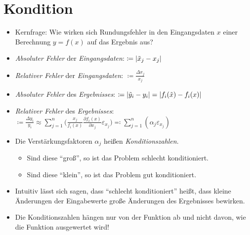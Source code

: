 	\section{Kondition} %
		\begin{itemize}
			\item Kernfrage: Wie wirken sich Rundungsfehler in den Eingangsdaten \( x \) einer Berechnung \( y = f(x) \) auf das Ergebnis aus?
			\item \textit{Absoluter Fehler} der \textit{Eingangsdaten}: \tabto{6.5cm} \phantom{XXX} \(\coloneqq \abs{\tilde{x} _ j - x _ j} \)
			\item \textit{Relativer Fehler} der \textit{Eingangsdaten}: \tabto{6.5cm} \phantom{XXX} \( \coloneqq \frac{\Delta x _ j}{x _ j} \)
			\item \textit{Absoluter Fehler} des \textit{Ergebnisses}: \tabto{6.5cm} \phantom{XXX} \( \coloneqq \abs{\tilde{y} _ i - y _ i} = \abs{f _ i (\tilde{x}) - f _ i (x)} \)
			\item \textit{Relativer Fehler} des \textit{Ergebnisses}: \tabto{6.5cm} \phantom{XXX} \( \coloneqq \frac{\Delta y _ i}{y _ i} \approx \sum_{j = 1}^{n} \bigg( \frac{x _ j}{f _ i (x)} \frac{\partial f _ i (x)}{\partial x _ j} \varepsilon _ { x _ j } \bigg) \eqqcolon \sum_{j = 1}^{n} ( \alpha _ j \varepsilon _ { x _ j } ) \)
			\item Die Verstärkungsfaktoren \( \alpha _ j \) heißen \textit{Konditionszahlen}.
				\begin{itemize}
					\item Sind diese \enquote{groß}, so ist das Problem schlecht konditioniert.
					\item Sind diese \enquote{klein}, so ist das Problem gut konditioniert.
				\end{itemize}
			\item Intuitiv lässt sich sagen, dass \enquote{schlecht konditioniert} heißt, dass kleine Änderungen der Eingabewerte große Änderungen des Ergebnisses bewirken.
			\item Die Konditionszahlen hängen nur von der Funktion ab und nicht davon, wie die Funktion ausgewertet wird!
		\end{itemize}

